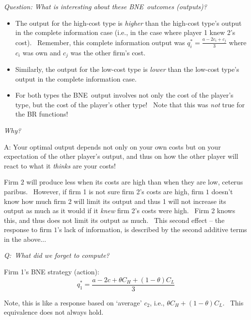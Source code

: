 \documentclass{article}
\begin{document}
\bigskip

\textit{Question: What is interesting about these BNE\ outcomes (outputs)?}

\bigskip

\begin{itemize}
\item The output for the high-cost type is \textit{higher} than the
high-cost type's output in the complete information case (i.e., in the case
where player 1 knew 2's cost). \ Remember, this complete information output
was $q_{i}^{\ast }=\frac{a-2c_{i}+c_{j}}{3}$ where $c_{i}$ was own and $%
c_{j} $ was the other firm's cost.

\item Similarly, the output for the low-cost type is \textit{lower } than
the low-cost type's output in the complete information case.

\item For both types the BNE\ output involves not only the cost of the
player's type, but the cost of the player's other type! \ Note that this was 
\textit{not} true for the BR functions! \ 
\end{itemize}

\bigskip

\textit{Why?}

\bigskip

A: Your optimal output depends not only on your own costs but on your
expectation of the other player's output, and thus on how the other player
will react to what it \textit{thinks} are your costs! \ 

Firm $2$ will produce less when its costs are high than when they are low,
ceterus paribus. \ However, if firm 1 is not sure firm 2's costs are high,
firm $1$ doesn't know how much firm 2 will limit its output and thus 1 will
not increase its output as much as it would if it \textit{knew }firm 2's
costs were high. \ Firm 2 knows this, and thus does not limit its output as
much. \ This second effect -- the response to firm $1$'s lack of
information, is described by the second additive terms in the above...

\bigskip

\textit{Q:\ What did we forget to compute?}

\bigskip

Firm 1's BNE strategy (action):%
\[
q_{1}^{\ast }=\frac{a-2c+\theta C_{H}+(1-\theta )C_{L}}{3} 
\]

\bigskip

Note, this is like a response based on `average' $c_{2}$, i.e., $\theta
C_{H}+(1-\theta )C_{L}$. \ This equivalence does not always hold.
\end{document}
